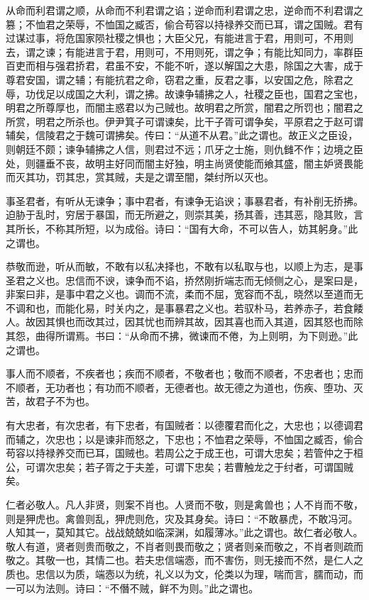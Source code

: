 \documentclass[]{article}
\begin{document}
从命而利君谓之顺，从命而不利君谓之谄；逆命而利君谓之忠，逆命而不利君谓之篡；不恤君之荣辱，不恤国之臧否，偷合苟容以持禄养交而已耳，谓之国贼。君有过谋过事，将危国家陨社稷之惧也；大臣父兄，有能进言于君，用则可，不用则去，谓之谏；有能进言于君，用则可，不用则死，谓之争；有能比知同力，率群臣百吏而相与强君挢君，君虽不安，不能不听，遂以解国之大患，除国之大害，成于尊君安国，谓之辅；有能抗君之命，窃君之重，反君之事，以安国之危，除君之辱，功伐足以成国之大利，谓之拂。故谏争辅拂之人，社稷之臣也，国君之宝也，明君之所尊厚也，而闇主惑君以为己贼也。故明君之所赏，闇君之所罚也；闇君之所赏，明君之所杀也。伊尹箕子可谓谏矣，比干子胥可谓争矣，平原君之于赵可谓辅矣，信陵君之于魏可谓拂矣。传曰：``从道不从君。''此之谓也。故正义之臣设，则朝廷不颇；谏争辅拂之人信，则君过不远；爪牙之士施，则仇雠不作；边境之臣处，则疆垂不丧，故明主好同而闇主好独，明主尚贤使能而飨其盛，闇主妒贤畏能而灭其功，罚其忠，赏其贼，夫是之谓至闇，桀纣所以灭也。

事圣君者，有听从无谏争；事中君者，有谏争无谄谀；事暴君者，有补削无挢拂。迫胁于乱时，穷居于暴国，而无所避之，则崇其美，扬其善，违其恶，隐其败，言其所长，不称其所短，以为成俗。诗曰：``国有大命，不可以告人，妨其躬身。''此之谓也。

恭敬而逊，听从而敏，不敢有以私决择也，不敢有以私取与也，以顺上为志，是事圣君之义也。忠信而不谀，谏争而不谄，挢然刚折端志而无倾侧之心，是案曰是，非案曰非，是事中君之义也。调而不流，柔而不屈，宽容而不乱，晓然以至道而无不调和也，而能化易，时关内之，是事暴君之义也。若驭朴马，若养赤子，若食餧人。故因其惧也而改其过，因其忧也而辨其故，因其喜也而入其道，因其怒也而除其怨，曲得所谓焉。书曰：``从命而不拂，微谏而不倦，为上则明，为下则逊。''此之谓也。

事人而不顺者，不疾者也；疾而不顺者，不敬者也；敬而不顺者，不忠者也；忠而不顺者，无功者也；有功而不顺者，无德者也。故无德之为道也，伤疾、堕功、灭苦，故君子不为也。

有大忠者，有次忠者，有下忠者，有国贼者：以德覆君而化之，大忠也；以德调君而辅之，次忠也；以是谏非而怒之，下忠也；不恤君之荣辱，不恤国之臧否，偷合苟容以持禄养交而已耳，国贼也。若周公之于成王也，可谓大忠矣；若管仲之于桓公，可谓次忠矣；若子胥之于夫差，可谓下忠矣；若曹触龙之于纣者，可谓国贼矣。

仁者必敬人。凡人非贤，则案不肖也。人贤而不敬，则是禽兽也；人不肖而不敬，则是狎虎也。禽兽则乱，狎虎则危，灾及其身矣。诗曰：``不敢暴虎，不敢冯河。人知其一，莫知其它。战战兢兢如临深渊，如履薄冰。''此之谓也。故仁者必敬人。敬人有道，贤者则贵而敬之，不肖者则畏而敬之；贤者则亲而敬之，不肖者则疏而敬之。其敬一也，其情二也。若夫忠信端悫，而不害伤，则无接而不然，是仁人之质也。忠信以为质，端悫以为统，礼义以为文，伦类以为理，喘而言，臑而动，而一可以为法则。诗曰：``不僭不贼，鲜不为则。''此之谓也。
\end{document}
